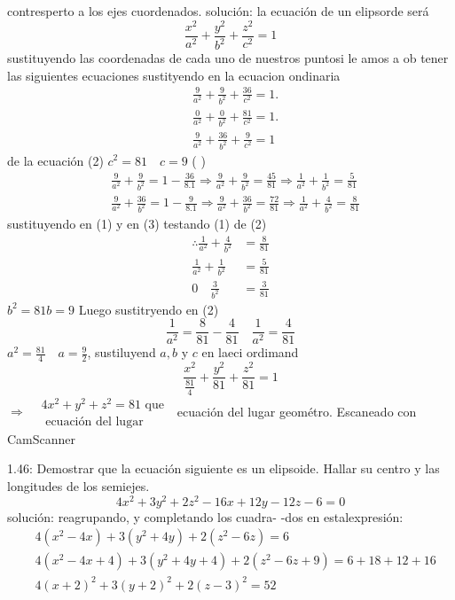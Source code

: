 contresperto a los ejes cuordenados.
solución: la ecuación de un elipsorde será
$$
\frac{x^2}{a^2}+\frac{y^2}{b^2}+\frac{z^2}{c^2}=1
$$
sustituyendo las coordenadas de cada uno de nuestros puntosi le amos a ob tener las siguientes ecuaciones sustityendo en la ecuacion ondinaria
$$
\begin{aligned}
	& \frac{9}{a^2}+\frac{9}{b^2}+\frac{36}{c^2}=1 . \\
	& \frac{0}{a^2}+\frac{0}{b^2}+\frac{81}{c^2}=1 . \\
	& \frac{9}{a^2}+\frac{36}{b^2}+\frac{9}{c^2}=1
\end{aligned}
$$
de la ecuación (2) $c^2=81 \quad c=9$
( )
$$
\begin{aligned}
	& \frac{9}{a^2}+\frac{9}{b^2}=1-\frac{36}{8.1} \Rightarrow \frac{9}{a^2}+\frac{9}{b^2}=\frac{45}{81} \Rightarrow \frac{1}{a^2}+\frac{1}{b^2}=\frac{5}{81} \\
	& \frac{9}{a^2}+\frac{36}{b^2}=1-\frac{9}{8.1} \Rightarrow \frac{9}{a^2}+\frac{36}{b^2}=\frac{72}{81} \Rightarrow \frac{1}{a^2}+\frac{4}{b^2}=\frac{8}{81}
\end{aligned}
$$
sustituyendo en (1) y en (3)
testando (1) de (2)
$$
\begin{aligned}
	\therefore \frac{1}{a^2}+\frac{4}{b^2} & =\frac{8}{81} \\
	\frac{1}{a^2}+\frac{1}{b^2} & =\frac{5}{81} \\
	0 \quad \frac{3}{b^2} & =\frac{3}{81}
\end{aligned}
$$
$b^2=81 b=9$ Luego sustitryendo
en (2)
$$
\frac{1}{a^2}=\frac{8}{81}-\frac{4}{81} \quad \frac{1}{a^2}=\frac{4}{81}
$$
$a^2=\frac{81}{4} \quad a=\frac{9}{2}$, sustiluyend
$a, b$ y $c$ en laeci ordimand
$$
\frac{x^2}{\frac{81}{4}}+\frac{y^2}{81}+\frac{z^2}{81}=1
$$
$\Rightarrow \begin{aligned} & 4 x^2+y^2+z^2=81 \text { que } \\ & \text { ecuación del lugar }\end{aligned}$
ecuación del lugar geométro.
Escaneado con CamScanner




1.46: Demostrar que la ecuación siguiente es un elipsoide. Hallar su centro y las longitudes de los semiejes.
$$
4 x^2+3 y^2+2 z^2-16 x+12 y-12 z-6=0
$$
solución: reagrupando, y completando los cuadra-
-dos en estalexpresión:
$$
\begin{aligned}
	& 4\left(x^2-4 x\right)+3\left(y^2+4 y\right)+2\left(z^2-6 z\right)=6 \\
	& 4\left(x^2-4 x+4\right)+3\left(y^2+4 y+4\right)+2\left(z^2-6 z+9\right)=6+18+12+16 \\
	& 4(x+2)^2+3(y+2)^2+2(z-3)^2=52
\end{aligned}
$$

